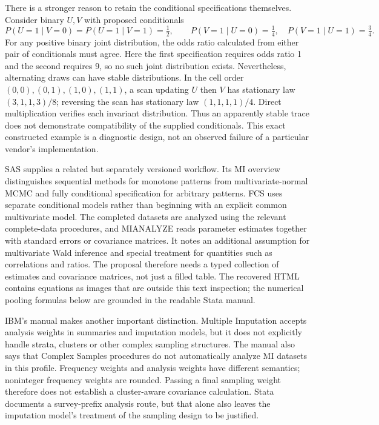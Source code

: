 There is a stronger reason to retain the conditional specifications themselves.
Consider binary $U,V$ with proposed conditionals
\begin{equation}
 P(U=1\mid V=0)=P(U=1\mid V=1)=\tfrac12,\qquad
 P(V=1\mid U=0)=\tfrac14,\quad P(V=1\mid U=1)=\tfrac34.
 \label{exec21:transport-conditionals}
\end{equation}
For any positive binary joint distribution, the odds ratio calculated from
either pair of conditionals must agree. Here the first specification requires
odds ratio 1 and the second requires 9, so no such joint distribution exists.
Nevertheless, alternating draws can have stable distributions. In the cell
order $(0,0),(0,1),(1,0),(1,1)$, a scan updating $U$ then $V$ has stationary
law $(3,1,1,3)/8$; reversing the scan has stationary law $(1,1,1,1)/4$.
Direct multiplication verifies each invariant distribution. Thus an apparently
stable trace does not demonstrate compatibility of the supplied conditionals.
This exact constructed example is a diagnostic design, not an observed failure
of a particular vendor's implementation.\cite{exec21_transport_reference}

SAS supplies a related but separately versioned workflow. Its MI overview
distinguishes sequential methods for monotone patterns from multivariate-normal
MCMC and fully conditional specification for arbitrary patterns. FCS uses
separate conditional models rather than beginning with an explicit common
multivariate model. The completed datasets are analyzed using the relevant
complete-data procedures, and MIANALYZE reads parameter estimates together with
standard errors or covariance matrices. It notes an additional assumption for
multivariate Wald inference and special treatment for quantities such as
correlations and ratios. The proposal therefore needs a typed collection of
estimates and covariance matrices, not just a filled table. The recovered HTML
contains equations as images that are outside this text inspection; the numerical
pooling formulas below are grounded in the readable Stata manual.
\cite{exec21_transport_sas_mi_intro,exec21_transport_sas_mianalyze_intro,exec21_transport_sas_combining}

IBM's manual makes another important distinction. Multiple Imputation accepts
analysis weights in summaries and imputation models, but it does not explicitly
handle strata, clusters or other complex sampling structures. The manual also
says that Complex Samples procedures do not automatically analyze MI datasets
in this profile. Frequency weights and analysis weights have different
semantics; noninteger frequency weights are rounded. Passing a final sampling
weight therefore does not establish a cluster-aware covariance calculation.
Stata documents a survey-prefix analysis route, but that alone also leaves
the imputation model's treatment of the sampling design to be justified.
\cite{exec21_transport_spss_missing,exec21_transport_stata_estimate}

